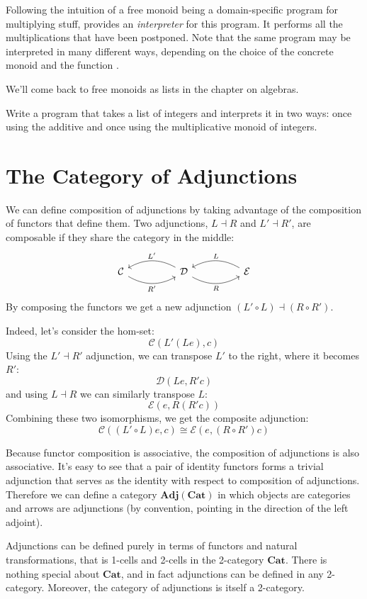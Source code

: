 \documentclass[DaoFP]{subfiles}
\begin{document}
Following the intuition of a free monoid being a domain-specific program for multiplying stuff,  provides an \emph{interpreter} for this program. It performs all the multiplications that have been postponed. Note that the same program may be interpreted in many different ways, depending on the choice of the concrete monoid and the function .

We'll come back to free monoids as lists in the chapter on algebras.

\begin{exercise}
Write a program that takes a list of integers and interprets it in two ways: once using the additive and once using the multiplicative monoid of integers.
\end{exercise}

\section{The Category of Adjunctions}
We can define composition of adjunctions by taking advantage of the composition of functors that define them. Two adjunctions, $L \dashv R$ and $L' \dashv R'$, are composable if they share the category in the middle:
\[
 \begin{tikzcd}
  \mathcal{C}
  \arrow[rr, bend right, "R'"']
  &&
  \mathcal{D}
  \arrow[ll, bend right, "L'"']
    \arrow[rr, bend right, "R"']
&&
  \mathcal{E}
  \arrow[ll, bend right, "L"']
 \end{tikzcd}
\]
By composing the functors we get a new adjunction $(L' \circ L) \dashv (R \circ R')$. 

Indeed, let's consider the hom-set:
\[ \mathcal{C}(L' (L e), c) \]
Using the $L' \dashv R'$ adjunction, we can transpose $L'$ to the right, where it becomes $R'$:
\[ \mathcal{D}(L e, R' c) \]
and using $L \dashv R$ we can similarly transpose $L$:
\[ \mathcal{E}( e, R(R' c)) \]
Combining these two isomorphisms, we get the composite adjunction:
\[ \mathcal{C}((L' \circ L) e, c) \cong \mathcal{E}( e, (R \circ R') c)\]

Because functor composition is associative, the composition of adjunctions is also associative. It's easy to see that a pair of identity functors forms a trivial adjunction that serves as the identity with respect to composition of adjunctions. Therefore we can define a category $\mathbf{Adj}(\mathbf{Cat})$ in which objects are categories and arrows are adjunctions (by convention, pointing in the direction of the left adjoint). 

Adjunctions can be defined purely in terms of functors and natural transformations, that is 1-cells and 2-cells in the 2-category $\mathbf{Cat}$. There is nothing special about $\mathbf{Cat}$, and in fact adjunctions can be defined in any 2-category. Moreover, the category of adjunctions is itself a 2-category.
\end{document}
